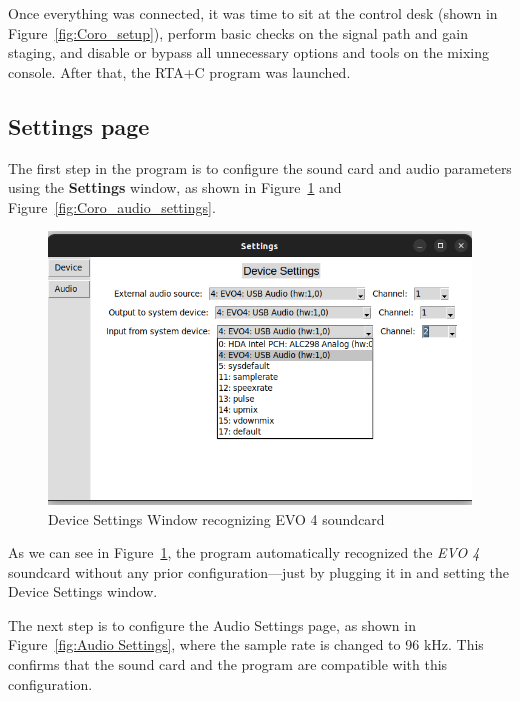 Once everything was connected, it was time to sit at the control desk (shown in Figure~\ref{fig:Coro_setup}), perform basic checks on the signal path and gain staging, and disable or bypass all unnecessary options and tools on the mixing console. After that, the RTA+C program was launched.

\subsection{Settings page}

The first step in the program is to configure the sound card and audio parameters using the \textbf{Settings} window, as shown in Figure~\ref{fig:Coro_device_settings} and Figure~\ref{fig:Coro_audio_settings}.


\begin{figure}[H]
	\centering
	\includegraphics[width=0.8
	\linewidth]{Figures/Coro_Device_settings.png}
	\caption{Device Settings Window recognizing EVO 4 soundcard}
	\label{fig:Coro_device_settings}
\end{figure}

As we can see in Figure~\ref{fig:Coro_device_settings}, the program automatically recognized the \textit{EVO 4} soundcard without any prior configuration—just by plugging it in and setting the Device Settings window.

The next step is to configure the Audio Settings page, as shown in Figure~\ref{fig:Audio Settings}, where the sample rate is changed to 96 kHz. This confirms that the sound card and the program are compatible with this configuration.


